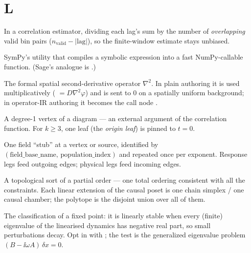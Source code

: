 \section*{L}
\begin{description}[leftmargin=0pt,style=nextline]

  \item[Lag-dependent normalization] In a correlation estimator, dividing each lag's
        sum by the number of \emph{overlapping} valid bin pairs ($n_{\mathrm{valid}}
        -|\text{lag}|$), so the finite-window estimate stays unbiased.

  \item[\code{lambdify}] SymPy's utility that compiles a symbolic expression into a
        fast NumPy-callable function. (Sage's analogue is .)

  \item[\code{Laplacian} / \code{Lap}] The formal spatial second-derivative
        operator $\nabla^{2}$. In plain authoring it is used multiplicatively
        ( $=D\nabla^{2}\varphi$) and is sent to $0$ on a
        spatially uniform background; in operator-IR authoring it becomes the call
        node .

  \item[Leaf / external leg] A degree-1 vertex of a diagram --- an external argument
        of the correlation function. For $k\ge 3$, one leaf (the \emph{origin leaf})
        is pinned to $t=0$.

  \item[Leg] One field ``stub'' at a vertex or source, identified by
        $(\text{field\_base\_name},\,\text{population\_index})$ and repeated once per
        exponent. Response legs feed outgoing edges; physical legs feed incoming
        edges.

  \item[Linear extension] A topological sort of a partial order --- one total
        ordering consistent with all the constraints. Each linear extension of the
        causal poset is one chain simplex / one causal chamber; the polytope is the
        disjoint union over all of them.

  \item[Linear stability] The classification of a fixed point: it is linearly stable
        when every (finite) eigenvalue of the linearised dynamics has negative real
        part, so small perturbations decay. Opt in with
        ; the test is the generalized eigenvalue
        problem $(B-\ii\omega A)\,\delta x=0$.


\end{description}
